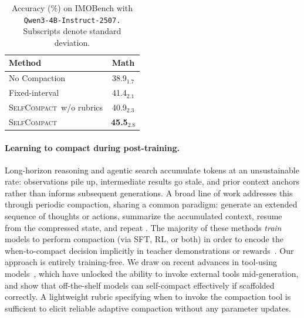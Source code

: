 \documentclass{article}
\newcommand{\method}{\textsc{{SelfCompact}}}
\begin{document}
\begin{table}
\vspace{-20pt}
\centering
\caption{Accuracy (\%) on IMOBench with \texttt{Qwen3-4B-Instruct-2507.} Subscripts denote standard deviation.}
\vspace{5pt}
\label{tab:selfcompact-math}
\begin{tabular}{lc}
\toprule
Method & Math \\
\midrule
No Compaction                & 38.9$_{1.7}$ \\
Fixed-interval          & 41.4$_{2.1}$ \\
\method~w/o rubrics & 40.9$_{2.3}$ \\ \midrule
\method            & \textbf{45.5}$_{2.8}$ \\
\bottomrule
\end{tabular}
\vspace{2pt}
\end{table}
\paragraph{Learning to compact during post-training.}
Long-horizon reasoning and agentic search accumulate tokens at an unsustainable rate: observations pile up, intermediate results go stale, and prior context anchors rather than informs subsequent generations. A broad line of work addresses this through periodic compaction, sharing a common paradigm: generate an extended sequence of thoughts or actions, summarize the accumulated context, resume from the compressed state, and repeat \citep{shao2025foldactefficientstablecontext,sun2025scalinglonghorizonllmagent}. The majority of these methods \textit{train} models to perform compaction (via SFT, RL, or both) in order to  encode the when-to-compact decision implicitly in teacher demonstrations or rewards~\citep{kontonis2026memento,yang2026accordionthinkingselfregulatedstepsummaries,yan2026inftythink, 
cassano2026selfsummarization,mitra2025motif,aghajohari2025markovian, wu2026reasoningcachecontinualimprovement, sun2025scalinglonghorizonllmagent, ye2025agentfoldlonghorizonwebagents, shao2025foldactefficientstablecontext, wu2026resumunlockinglonghorizonsearch}. 
Our approach is entirely training-free. We draw on recent advances in tool-using models~\citep{5team2025glm45agenticreasoningcoding,minimax2026m25}, which have unlocked the ability to invoke external tools mid-generation, and show that off-the-shelf models can self-compact effectively if scaffolded correctly. A lightweight rubric specifying when to invoke the compaction tool is sufficient to elicit reliable adaptive compaction without any parameter updates.
\end{document}

